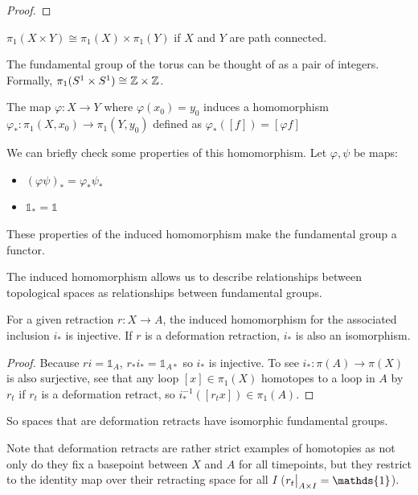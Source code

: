 \documentclass[10pt]{article}
\newcommand\restr[2]{{%
  \left.\kern-\nulldelimiterspace %
  #1 %
  \vphantom{\big|} %
  \right|_{#2} %
}}
\begin{document}
\begin{proof}
\end{proof}


\begin{theorem}
	$\pi_1(X \times Y) \cong \pi_1(X) \times \pi_1(Y)$ if $X$ and $Y$ are path connected.
\end{theorem}

\begin{example}[Torus]
	The fundamental group of the torus can be thought of as a pair of integers. Formally, $\pi_1(S^1 \times S^1) \cong \mathbb{Z} \times \mathbb{Z}$. 
\end{example}


\begin{definition}
	The map $\varphi: X \to Y$ where $\varphi(x_0) = y_0$ induces a homomorphism $\varphi_*: \pi_1(X, x_0) \to \pi_1(Y, y_0)$ defined as $\varphi_*([f]) = [\varphi f]$
\end{definition}

We can briefly check some properties of this homomorphism. Let $\varphi, \psi$ be maps:
\begin{itemize}
	\item{$(\varphi\psi)_* = \varphi_*\psi_*$}
	\item{$\mathds{1}_* = \mathds{1}$}
\end{itemize}
These properties of the induced homomorphism make the fundamental group a functor.

The induced homomorphism allows us to describe relationships between topological spaces as relationships between fundamental groups.

\begin{proposition}[]
	For a given retraction $r: X \to A$, the induced homomorphism for the associated inclusion $i_*$ is injective. If $r$ is a deformation retraction, $i_*$ is also an isomorphism.
\end{proposition}

\begin{proof}
	Because $ri = \mathds{1}_A$, $r_*i_* = \mathds{1}_{A*}$ so $i_*$ is
	injective. To see $i_*: \pi(A) \to \pi(X)$ is also surjective, see that any
	loop $[x] \in \pi_1(X)$ homotopes to a loop in $A$ by $r_t$ if $r_t$ is a deformation
	retract, so $i_*^{-1}([r_tx]) \in \pi_1(A)$.
\end{proof}

So spaces that are deformation retracts have isomorphic fundamental groups.

Note that deformation retracts are rather strict examples of homotopies as not
only do they fix a basepoint between $X$ and $A$ for all timepoints, but they
restrict to the identity map over their retracting space for all $I$
($\restr{r_t}{A\times I} = \mathds{1}$). 
\end{document}

